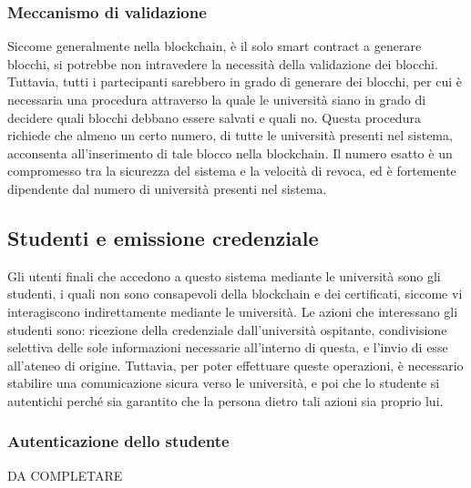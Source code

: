 \documentclass[a4paper,12pt]{article}
\begin{document}
\subsubsection{Meccanismo di validazione}
Siccome generalmente nella blockchain, è il solo smart contract a generare blocchi, si potrebbe non intravedere la necessità della validazione dei blocchi. Tuttavia, tutti i partecipanti sarebbero in grado di generare dei blocchi, per cui è necessaria una procedura attraverso la quale le università siano in grado di decidere quali blocchi debbano essere salvati e quali no. 
\newline Questa procedura richiede che almeno un certo numero, di tutte le università presenti nel sistema, acconsenta all'inserimento di tale blocco nella blockchain. Il numero esatto è un compromesso tra la sicurezza del sistema e la velocità di revoca, ed è fortemente dipendente dal numero di università presenti nel sistema.
\subsection{Studenti e emissione credenziale}
Gli utenti finali che accedono a questo sistema mediante le università sono gli studenti, i quali non sono consapevoli della blockchain e dei certificati, siccome vi interagiscono indirettamente mediante le università. Le azioni che interessano gli studenti sono: ricezione della credenziale dall'università ospitante, condivisione selettiva delle sole informazioni necessarie all'interno di questa, e l'invio di esse all'ateneo di origine.
\newline Tuttavia, per poter effettuare queste operazioni, è necessario stabilire una comunicazione sicura verso le università, e poi che lo studente si autentichi perché sia garantito che la persona dietro tali azioni sia proprio lui.
\subsubsection{Autenticazione dello studente}
DA COMPLETARE
\end{document}
